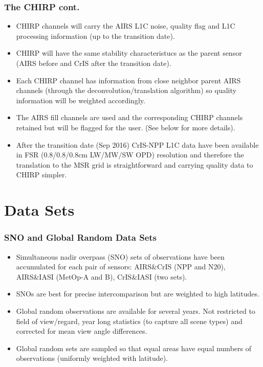 \documentclass[10pt,t]{beamer}
\begin{document}
\begin{frame}
  \frametitle{The CHIRP cont.}
  \begin{itemize}
  \item CHIRP channels will carry the AIRS L1C noise, quality flag and L1C processing information (up to the transition date).
    \item CHIRP will have the same stability characteristucs as the parent sensor (AIRS before and CrIS after the transition date).
  \item Each CHIRP channel has information from close neighbor parent AIRS channels (through the deconvolution/translation algorithm) so quality information will be weighted accordingly.
  \item The AIRS fill channels are used and the corresponding CHIRP channels retained  but will be flagged for the user. (See below for more details).
  \item After the transition date (Sep 2016) CrIS-NPP L1C data have been available in FSR (0.8/0.8/0.8cm LW/MW/SW OPD) resolution and therefore the translation to the MSR grid is straightforward and carrying quality data to CHIRP simpler.
  \end{itemize}
\end{frame}

\section{Data Sets}
\begin{frame}
  \frametitle{SNO and Global Random Data Sets}
  \begin{itemize}
  \item Simultaneous nadir overpass (SNO) sets of observations have been accumulated for each pair of sensors: AIRS\&CrIS (NPP and N20),  AIRS\&IASI (MetOp-A and B), CrIS\&IASI (two sets).
  \item SNOs are best for precise intercomparison but are weighted to high latitudes.
  \item Global random observations are available for several years. Not restricted to field of view/regard, year long statistics (to capture all scene types) and corrected for mean view angle differences.
  \item Global random sets are sampled so that equal areas have equal numbers of observations (uniformly weighted with latitude).
  \end{itemize}
\end{frame}
\end{document}
